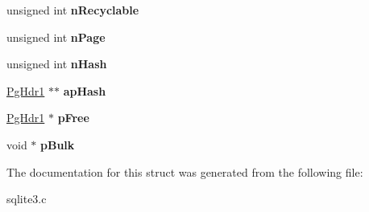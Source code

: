 \begin{DoxyCompactItemize}
\item 
unsigned int {\bfseries n\+Recyclable}\hypertarget{structPCache1_a3501394bd251f08d1f9d26d3b2d4c67c}{}\label{structPCache1_a3501394bd251f08d1f9d26d3b2d4c67c}

\item 
unsigned int {\bfseries n\+Page}\hypertarget{structPCache1_ace332c276e28352992529f60f0ac457c}{}\label{structPCache1_ace332c276e28352992529f60f0ac457c}

\item 
unsigned int {\bfseries n\+Hash}\hypertarget{structPCache1_a09d9488a8a3a52822e33dd43e14c69e1}{}\label{structPCache1_a09d9488a8a3a52822e33dd43e14c69e1}

\item 
\hyperlink{structPgHdr1}{Pg\+Hdr1} $\ast$$\ast$ {\bfseries ap\+Hash}\hypertarget{structPCache1_a1169ec7ba2a628d89841d16ced651e1f}{}\label{structPCache1_a1169ec7ba2a628d89841d16ced651e1f}

\item 
\hyperlink{structPgHdr1}{Pg\+Hdr1} $\ast$ {\bfseries p\+Free}\hypertarget{structPCache1_a91dcc2d2771fa17cf065a1f9ff427d5f}{}\label{structPCache1_a91dcc2d2771fa17cf065a1f9ff427d5f}

\item 
void $\ast$ {\bfseries p\+Bulk}\hypertarget{structPCache1_a32591cc3f60587a1422627a080109fb7}{}\label{structPCache1_a32591cc3f60587a1422627a080109fb7}

\end{DoxyCompactItemize}


The documentation for this struct was generated from the following file\+:\begin{DoxyCompactItemize}
\item 
sqlite3.\+c\end{DoxyCompactItemize}
